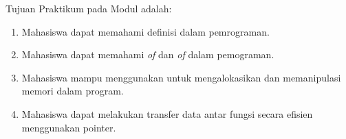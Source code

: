\documentclass[../main.tex]{subfiles}
\begin{document}
    \noindent Tujuan Praktikum pada Modul {} {\leftmark} adalah:
    \begin{enumerate}
        \item Mahasiswa dapat memahami definisi {\pointer} dalam pemrograman.
        \item Mahasiswa dapat memahami {\struct} \textit{of} {\pointer} dan {\pointer} \textit{of} {\struct} dalam pemograman.
        \item Mahasiswa mampu menggunakan {\pointer} untuk mengalokasikan dan memanipulasi memori dalam program. 
        \item Mahasiswa dapat melakukan transfer data antar fungsi secara efisien menggunakan pointer.
    \end{enumerate}
\end{document}
